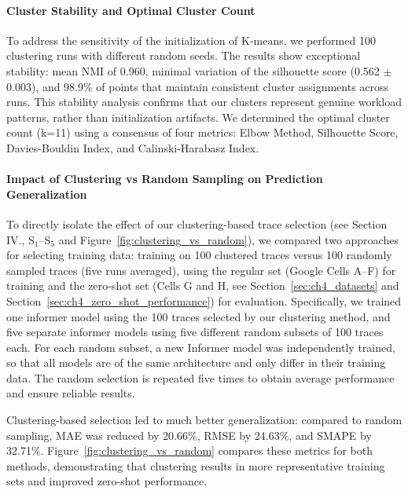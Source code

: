 \paragraph{Cluster Stability and Optimal Cluster Count}
\label{sec:ch4_cluster_stability}

To address the sensitivity of the initialization of K-means, we performed 100 clustering runs with different random seeds. The results show exceptional stability: mean \ac{NMI} of 0.960, minimal variation of the silhouette score (0.562 $\pm$ 0.003), and 98.9\% of points that maintain consistent cluster assignments across runs. This stability analysis confirms that our clusters represent genuine workload patterns, rather than initialization artifacts. We determined the optimal cluster count (k=11) using a consensus of four metrics: Elbow Method, Silhouette Score, Davies-Bouldin Index, and Calinski-Harabasz Index. 


\paragraph{Impact of Clustering vs Random Sampling on Prediction Generalization}

To directly isolate the effect of our clustering-based trace selection (see Section IV., S$_1$--S$_5$ and Figure~\ref{fig:clustering_vs_random}), we compared two approaches for selecting training data: training on 100 clustered traces versus 100 randomly sampled traces (five runs averaged), using the regular set (Google Cells A--F) for training and the zero-shot set (Cells G and H, see Section~\ref{sec:ch4_datasets} and Section~\ref{sec:ch4_zero_shot_performance}) for evaluation. Specifically, we trained one informer model using the 100 traces selected by our clustering method, and five separate informer models using five different random subsets of 100 traces each. For each random subset, a new Informer model was independently trained, so that all models are of the same architecture and only differ in their training data. The random selection is repeated five times to obtain average performance and ensure reliable results.

Clustering-based selection led to much better generalization: compared to random sampling, \ac{MAE} was reduced by 20.66\%, \ac{RMSE} by 24.63\%, and \ac{SMAPE} by 32.71\%. Figure~\ref{fig:clustering_vs_random} compares these metrics for both methods, demonstrating that clustering results in more representative training sets and improved zero-shot performance.


